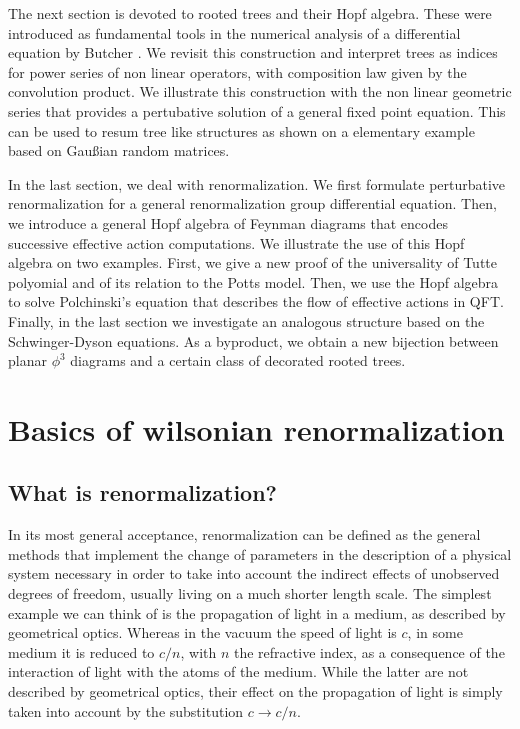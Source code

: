 \documentclass[12pt,here,feynmf]{article}
\begin{document}
The next section is devoted to rooted trees and their Hopf algebra. These were introduced as fundamental tools in the numerical analysis of a differential equation by Butcher \cite{butcher}. We revisit this construction and interpret trees as indices for power series of non linear operators, with composition law given by the convolution product. We illustrate this construction with the non linear geometric series that provides a pertubative solution of a general fixed point equation. This can be used to resum tree like structures as shown on a elementary example based on Gau\ss ian random matrices.

In the last section, we deal with renormalization. We first formulate perturbative renormalization for a general renormalization group differential equation. Then, we introduce a general Hopf algebra of Feynman diagrams that encodes successive effective action computations. We illustrate the use of this Hopf algebra on two examples. First, we give a new proof of the universality of Tutte polyomial and of its relation to the Potts model. Then, we use the Hopf algebra to solve Polchinski's equation that describes the flow of effective actions in QFT. Finally, in the last section we investigate an analogous structure based on the Schwinger-Dyson equations. As a byproduct, we obtain a new bijection between planar $\phi^{3}$ diagrams and a certain class of decorated rooted trees.  
 



\section{Basics of wilsonian renormalization}

\subsection{What is renormalization?}



In its most general acceptance, renormalization can be defined as the general methods that implement the change of parameters in the description of a physical system necessary in order to take into account the indirect effects of unobserved degrees of freedom, usually living on a much shorter length scale. The simplest example we can think of is the propagation of light in a medium, as described by geometrical optics. Whereas in the vacuum the speed of light is $c$, in some medium it is reduced to $c/n$, with $n$ the refractive index, as a consequence of the interaction of light with the atoms of the medium. While the latter are not described by geometrical optics, their effect on the propagation of light is simply taken into account by the substitution $c\rightarrow c/n$.
\end{document}
